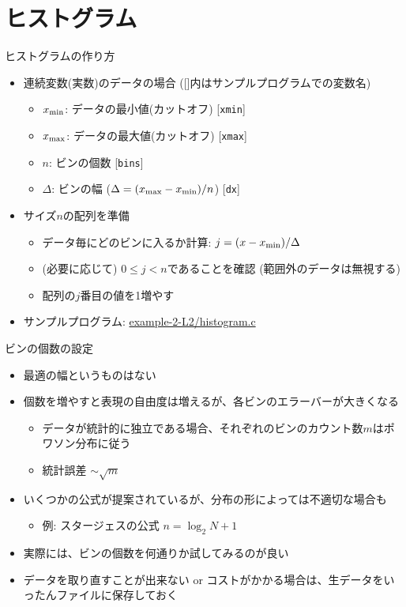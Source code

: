 \section{ヒストグラム}

\begin{frame}[t,fragile]{ヒストグラムの作り方}
  \begin{itemize}
    \setlength{\itemsep}{1em}
  \item 連続変数(実数)のデータの場合 ([]内はサンプルプログラムでの変数名)
    \begin{itemize}
    \item $x_{\rm min}$: データの最小値(カットオフ) [{\tt xmin}]
    \item $x_{\rm max}$: データの最大値(カットオフ) [{\tt xmax}]
    \item $n$: ビンの個数 [{\tt bins}]
    \item $\Delta$: ビンの幅 ($\Delta=(x_{\rm max}-x_{\rm min}) / n$) [{\tt dx}]
    \end{itemize}
  \item サイズ$n$の配列を準備
    \begin{itemize}
    \item データ毎にどのビンに入るか計算: $j = (x - x_{\rm min}) / \Delta$
    \item (必要に応じて) $0 \le j < n$であることを確認 (範囲外のデータは無視する)
    \item 配列の$j$番目の値を1増やす
    \end{itemize}
    \item サンプルプログラム: \href{https://github.com/todo-group/computer-experiments/blob/master/exercise/monte_carlo/histogram.c}{example-2-L2/histogram.c}
  \end{itemize}
\end{frame}

\begin{frame}[t,fragile]{ビンの個数の設定}
  \begin{itemize}
  \item 最適の幅というものはない
  \item 個数を増やすと表現の自由度は増えるが、各ビンのエラーバーが大きくなる
    \begin{itemize}
    \item データが統計的に独立である場合、それぞれのビンのカウント数$m$はポワソン分布に従う
    \item 統計誤差 $\sim \sqrt{m}$
    \end{itemize}
  \item いくつかの公式が提案されているが、分布の形によっては不適切な場合も
    \begin{itemize}
    \item 例: スタージェスの公式 $n = \log_2 N + 1$
    \end{itemize}
  \item 実際には、ビンの個数を何通りか試してみるのが良い
  \item データを取り直すことが出来ない or コストがかかる場合は、生データをいったんファイルに保存しておく
  \end{itemize}
\end{frame}
